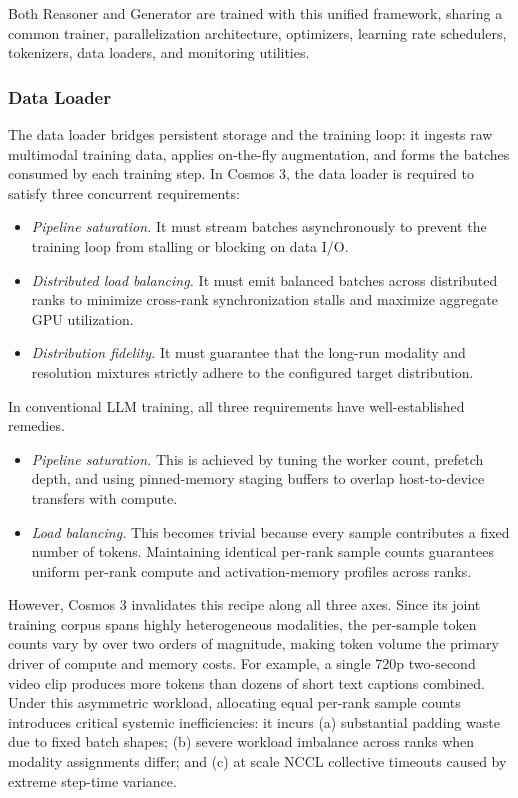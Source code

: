 \documentclass{llmxive}
\begin{document}
Both Reasoner and Generator are trained with this unified framework, sharing a common trainer, parallelization architecture, optimizers, learning rate schedulers, tokenizers, data loaders, and monitoring utilities.

\subsubsection{Data Loader}
\label{sec::data-loader}

The data loader bridges persistent storage and the training loop: it ingests raw multimodal training data, applies on-the-fly augmentation, and forms the batches consumed by each training step. In Cosmos 3, the data loader is required to satisfy three concurrent requirements:
\begin{itemize}
    \item \textit{Pipeline saturation.} It must stream batches asynchronously to prevent the training loop from stalling or blocking on data I/O.
    \item \textit{Distributed load balancing.} It must emit balanced batches across distributed ranks to minimize cross-rank synchronization stalls and maximize aggregate GPU utilization.
    \item \textit{Distribution fidelity.} It must guarantee that the long-run modality and resolution mixtures strictly adhere to the configured target distribution.
\end{itemize}

In conventional LLM training, all three requirements have well-established remedies.
\begin{itemize}
  \item \textit{Pipeline saturation.} This is achieved by tuning the worker count, prefetch depth, and using pinned-memory staging buffers to overlap host-to-device transfers with compute.
  \item \textit{Load balancing.} This becomes trivial because every sample contributes a fixed number of tokens. Maintaining identical per-rank sample counts guarantees uniform per-rank compute and activation-memory profiles across ranks.
\end{itemize}

However, Cosmos 3 invalidates this recipe along all three axes. Since its joint training corpus spans highly heterogeneous modalities, the per-sample token counts vary by over two orders of magnitude, making token volume the primary driver of compute and memory costs. For example, a single 720p two-second video clip produces more tokens than dozens of short text captions combined. Under this asymmetric workload, allocating equal per-rank sample counts introduces critical systemic inefficiencies: it incurs (a) substantial padding waste due to fixed batch shapes; (b) severe workload imbalance across ranks when modality assignments differ; and (c) at scale NCCL collective timeouts caused by extreme step-time variance.
\end{document}
